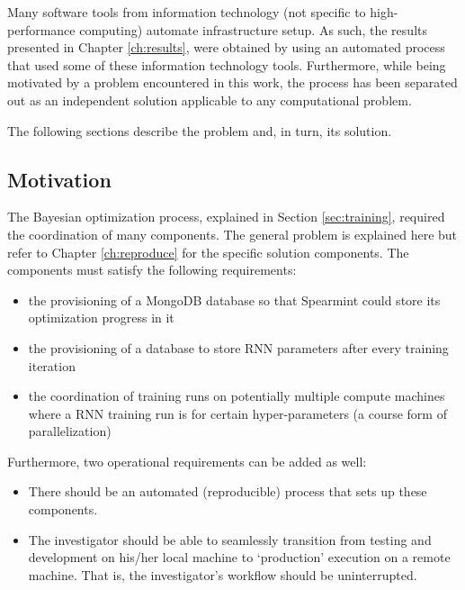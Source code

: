 Many software tools from information technology (not specific to high-performance computing) automate infrastructure setup.
%
As such, the results presented in Chapter \ref{ch:results}, were obtained by using an automated process that used some of these information technology tools.
%
Furthermore, while being motivated by a problem encountered in this work, the process has been separated out as an independent solution applicable to any computational problem.


The following sections describe the problem and, in turn, its solution.


\subsection{Motivation}
\label{sec:pccmotivation}

The Bayesian optimization process, explained in Section \ref{sec:training}, required the coordination of many components.
%
The general problem is explained here but refer to Chapter \ref{ch:reproduce} for the specific solution components.
%
The components must satisfy the following requirements:
%
\begin{itemize}

\item 
  the provisioning of a \textsf{MongoDB} database so that \textsf{Spearmint} could store its optimization progress in it

\item
  the provisioning of a database to store RNN parameters after every training iteration

\item
  the coordination of training runs on potentially multiple compute machines where a RNN training run is for certain hyper-parameters (a course form of parallelization)

\end{itemize}

Furthermore, two operational requirements can be added as well:

\begin{itemize}

\item
  There should be an automated (reproducible) process that sets up these components.

\item
  The investigator should be able to seamlessly transition from testing and development on his/her local machine to `production' execution on a remote machine.
%
That is, the investigator's workflow should be uninterrupted.

\end{itemize}


